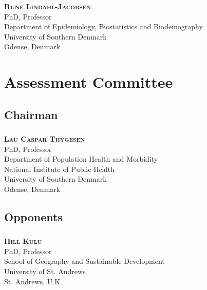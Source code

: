 \documentclass[oneside,bibliography=totocnumbered]{scrbook}
\begin{document}
\subsection*{}
\textbf{\textsc{Rune Lindahl-Jacobsen}}							\\
PhD, Professor													\\
Department of Epidemiology, Biostatistics and Biodemography	 	\\
University of Southern Denmark									\\
Odense, Denmark	




\chapter*{Assessment Committee}

\vspace{0.25in}

\section*{Chairman}	
\subsection*{}									
\textbf{\textsc{Lau Caspar Thygesen}}							\\
PhD, Professor													\\
Department of Population Health and Morbidity						\\
National Institute of Public Health								\\
University of Southern Denmark									\\
Odense, Denmark	

\vspace{0.35in}

\section*{Opponents}										
\subsection*{}
\textbf{\textsc{Hill Kulu}}										\\
PhD, Professor													\\
School of Geography and Sustainable Development 				\\
University of St. Andrews										\\
St. Andrews, U.K.												
\end{document}
